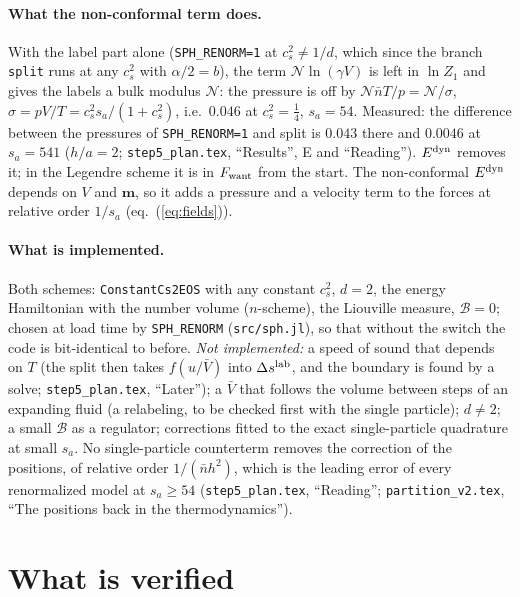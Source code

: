 \documentclass[11pt,aps,preprint,nofootinbib,superscriptaddress,tightenlines]{revtex4-2}
\newcommand{\klab}{\mathcal B}
\def\Eq#1{eq.~(\ref{#1})}
\let\oldparagraph\paragraph
\renewcommand{\paragraph}{\par\bigskip\oldparagraph}
\begin{document}
\paragraph{What the non-conformal term does.}  With the label part alone (\texttt{SPH\_RENORM=1} at $c_s^2\neq1/d$, which since the branch
\texttt{split} runs at any $c_s^2$ with $\alpha/2=b$), the term $\mathcal N\ln(\gamma V)$ is left in $\ln Z_1$ and gives the labels a bulk modulus
$\mathcal N$: the pressure is off by $\mathcal N\bar nT/p=\mathcal N/\sigma$, $\sigma=pV/T=c_s^2s_a/(1+c_s^2)$, i.e.\ $0.046$ at $c_s^2=\tfrac14$,
$s_a=54$.  Measured: the difference between the pressures of \texttt{SPH\_RENORM=1} and split is $0.043$ there and $0.0046$ at $s_a=541$ ($h/a=2$;
\nolinkurl{step5_plan.tex}, ``Results'', E and ``Reading'').  $E^{\rm dyn}$ removes it; in the Legendre scheme it is in $F_{\rm want}$ from the start.
The non-conformal $E^{\rm dyn}$ depends on $V$ and $\bm m$, so it adds a pressure and a velocity term to the forces at relative order $1/s_a$
(\Eq{eq:fields}).

\paragraph{What is implemented.}  Both schemes: \texttt{ConstantCs2EOS} with any constant $c_s^2$, $d=2$, the energy Hamiltonian with the number volume
($n$-scheme), the Liouville measure, $\klab=0$; chosen at load time by \texttt{SPH\_RENORM} (\nolinkurl{src/sph.jl}), so that without the switch the
code is bit-identical to before.  \emph{Not implemented:} a speed of sound that depends on $T$ (the split then takes $f(u/\bar V)$ into
$\Delta s^{\rm lab}$, and the boundary is found by a solve; \nolinkurl{step5_plan.tex}, ``Later''); a $\bar V$ that follows the volume between steps of an
expanding fluid (a relabeling, to be checked first with the single particle); $d\neq2$; a small $\klab$ as a regulator; corrections fitted to the
exact single-particle quadrature at small $s_a$.  No single-particle counterterm removes the correction of the positions, of relative order
$1/(\bar nh^2)$, which is the leading error of every renormalized model at $s_a\ge54$ (\nolinkurl{step5_plan.tex}, ``Reading'';
\nolinkurl{partition_v2.tex}, ``The positions back in the thermodynamics'').

\section{What is verified}
\label{sec:verified}
\end{document}
